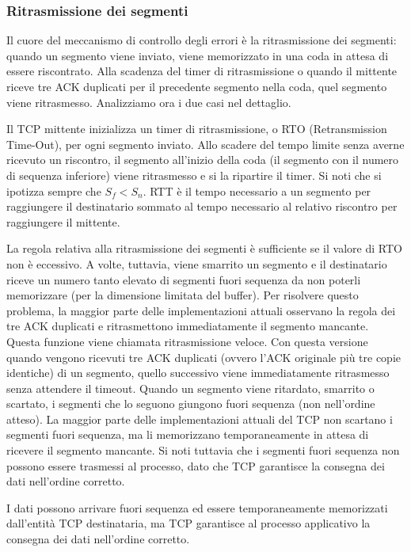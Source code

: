 \subsubsection{Ritrasmissione dei segmenti}
Il cuore del meccanismo di controllo degli errori è la ritrasmissione dei segmenti: quando un segmento viene inviato, viene memorizzato in una coda in attesa di essere riscontrato. Alla scadenza del timer di ritrasmissione o quando il mittente riceve tre ACK duplicati per il precedente segmento nella coda, quel segmento viene ritrasmesso. Analizziamo ora i due casi nel dettaglio.

Il TCP mittente inizializza un timer di ritrasmissione, o RTO (Retransmission Time-Out), per ogni segmento inviato. Allo scadere del tempo limite senza averne ricevuto un riscontro, il segmento all'inizio della coda (il segmento con il numero di sequenza inferiore) viene ritrasmesso e si la ripartire il timer. Si noti che si ipotizza sempre che $S_f < S_n$. RTT è il tempo necessario a un segmento per raggiungere il destinatario sommato al tempo necessario al relativo riscontro per raggiungere il mittente.

La regola relativa alla ritrasmissione dei segmenti è sufficiente se il valore di RTO non è eccessivo. A volte, tuttavia, viene smarrito un segmento e il destinatario riceve un numero tanto elevato di segmenti fuori sequenza da non poterli memorizzare (per la dimensione limitata del buffer). Per risolvere questo problema, la maggior parte delle implementazioni attuali osservano la regola dei tre ACK duplicati e ritrasmettono immediatamente il segmento mancante. Questa funzione viene chiamata ritrasmissione veloce. Con questa versione quando vengono ricevuti tre ACK duplicati (ovvero l'ACK originale più tre copie identiche) di un segmento, quello successivo viene immediatamente ritrasmesso senza attendere il timeout. Quando un segmento viene ritardato, smarrito o scartato, i segmenti che lo seguono giungono fuori sequenza (non nell'ordine atteso). La maggior parte delle implementazioni attuali del TCP non scartano i segmenti fuori sequenza, ma li memorizzano temporaneamente in attesa di ricevere il segmento mancante. Si noti tuttavia che i segmenti fuori sequenza non possono essere trasmessi al processo, dato che TCP garantisce la consegna dei dati nell'ordine corretto.

I dati possono arrivare fuori sequenza ed essere temporaneamente memorizzati dall'entità TCP destinataria, ma TCP garantisce al processo applicativo la consegna dei dati nell'ordine corretto.

